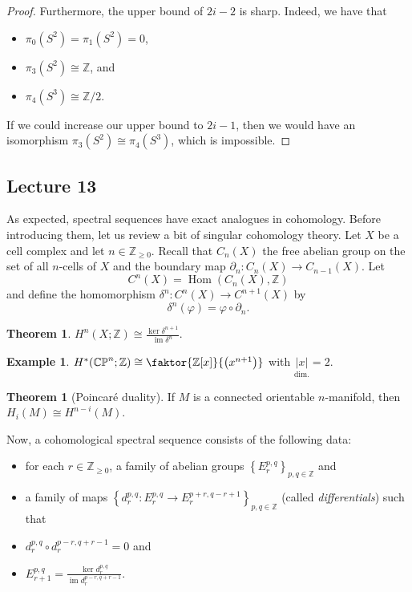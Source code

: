 \documentclass[10pt,letterpaper,cm]{nupset}
\theoremstyle{definition}
\newtheorem{exmp}[defn]{Example}
\theoremstyle{theorem}
\newtheorem{theorem}[defn]{Theorem}
\theoremstyle{remark}
\newcommand{\CP}{\mathbb{CP}}
\newcommand{\Z}{\mathbb Z}
\newcommand{\1}{\mathbb{1}}
\newcommand{\0}{\vec 0}
\DeclareMathOperator{\im}{im}
\DeclareMathOperator{\Hom}{Hom}
\newcommand{\bi}{\begin{itemize}}
\newcommand{\ei}{\end{itemize}}
\begin{document}
\begin{proof}
\medskip


Furthermore, the upper bound of $2i-2$ is sharp. Indeed, we have that
\bi
\item $\pi_0(S^2) = \pi_1(S^2) =0$,
\item $\pi_3(S^2) \cong \Z$, and
\item $\pi_4(S^3) \cong \Z/2$.
\ei
If we could increase our upper bound to $2i-1$, then we would have an isomorphism  $\pi_3(S^2) \cong  \pi_4(S^3)$, which is impossible.
\end{proof}

\subsection{Lecture 13}

As expected, spectral sequences have exact analogues in cohomology.  Before introducing them, let us review a bit of singular cohomology theory.  Let $X$ be a cell complex and let $n\in \Z_{\geq0}$. Recall that $C_n(X)$ the free abelian group on the set of all $n$-cells of $X$ and the boundary map $\partial_n : C_n(X) \to C_{n-1}(X)$. Let $$C^{n}(X) = \Hom(C_{n}(X), \Z) $$ and define the homomorphism $\delta^n : C^n(X) \to C^{n+1}(X)$ by $$\delta^n(\varphi) = \varphi \circ \partial_n.$$

\begin{theorem}\label{cohomiso}
$H^n(X;\Z) \cong \frac{\ker{\delta^{n+1}}}{\im{\delta^n}}$.
\end{theorem}

\begin{exmp}
$H^{\ast}(\CP^n; \Z) \cong \faktor{\Z[x]}{\left(x^{n+1}\right)}$ with $\underset{\text{dim.}}{\lvert{x}\rvert} =2$.
\end{exmp}

\begin{theorem}[Poincar\'e duality]
If $M$ is a connected orientable $n$-manifold, then $H_i(M) \cong H^{n-i}(M)$.
\end{theorem}

\medskip

Now, a cohomological spectral sequence consists of the following data: 
\bi
\item for each $r\in \Z_{\geq 0}$, a family of abelian groups $\left\{E_r^{p,q}\right\}_{p,q\in \Z}$ and
\item a family of maps  $\left\{d_r^{p,q} : E_r^{p,q} \to E_r^{p+r, q-r+1}\right\}_{p,q\in \Z}$ (called \textit{differentials})  such that
\item $d_r^{p,q} \circ d_r^{p-r, q+r-1} =0$ and
\item $E_{r+1}^{p,q} = \frac{\ker{d_r^{p,q}}}{\im{d_r^{p-r, q+r-1}}}$.
\ei
\end{document}
